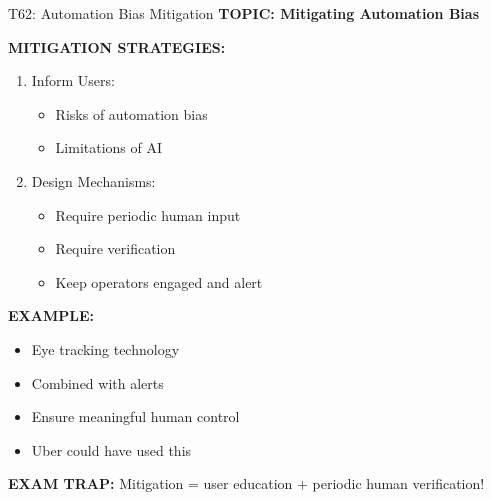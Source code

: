\documentclass[8pt]{beamer}
\begin{document}
	\begin{frame}{T62: Automation Bias Mitigation}
		\fontsize{6.5}{7.5}\selectfont
		\textbf{TOPIC: Mitigating Automation Bias}
		
		\vspace{0.1cm}
		\textbf{MITIGATION STRATEGIES:}
		\begin{enumerate}
			\item \textcolor{myblue}{Inform Users:}
			\begin{itemize}
				\item Risks of automation bias
				\item Limitations of AI
			\end{itemize}
			\item \textcolor{myblue}{Design Mechanisms:}
			\begin{itemize}
				\item Require periodic human input
				\item Require verification
				\item Keep operators engaged and alert
			\end{itemize}
		\end{enumerate}
		
		\vspace{0.1cm}
		\textbf{EXAMPLE:}
		\begin{itemize}
			\item Eye tracking technology
			\item Combined with alerts
			\item Ensure meaningful human control
			\item Uber could have used this
		\end{itemize}
		
		\textcolor{myred}{\textbf{EXAM TRAP:}} Mitigation = \textcolor{myblue}{user education + periodic human verification}!
	\end{frame}
	
\end{document}

